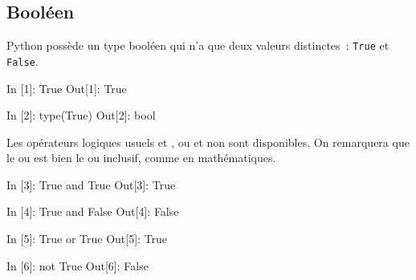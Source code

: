 \documentclass{magnoliaold}
\begin{document}









\subsection{Booléen}

Python possède un type booléen qui n'a que deux valeurs distinctes~:
\verb_True_ et \verb_False_. 

\begin{pythoncode}
In [1]: True
Out[1]: True

In [2]: type(True)
Out[2]: bool
\end{pythoncode}

\noindent
Les opérateurs logiques usuels \og et \fg, \og ou \fg et \og non \fg sont disponibles. On
remarquera que le \og ou \fg est bien le ou inclusif, comme en mathématiques.

\begin{pythoncode}
In [3]: True and True
Out[3]: True

In [4]: True and False
Out[4]: False

In [5]: True or True
Out[5]: True

In [6]: not True
Out[6]: False
\end{pythoncode}
\end{document}
